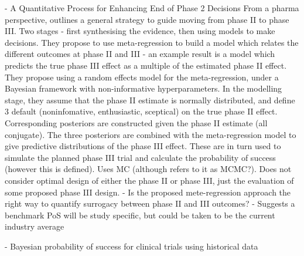 \documentclass{article} %
\begin{document}
\cite{Sabin2014} - A Quantitative Process for Enhancing End of Phase 2 Decisions
From a pharma perspective, outlines a general strategy to guide moving from phase II to phase III. Two stages - first synthesising the evidence, then using models to make decisions. They propose to use meta-regression to build a model which relates the different outcomes at phase II and III - an example result is a model which predicts the true phase III effect as a multiple of the estimated phase II effect. They propose using a random effects model for the meta-regression, under a Bayesian framework with non-informative hyperparameters. In the modelling stage, they assume that the phase II estimate is normally distributed, and define 3 default (noninfomative, enthusiastic, sceptical) on the true phase II effect. Corresponding posteriors are constructed given the phase II estimate (all conjugate). The three posteriors are combined with the meta-regression model to give predictive distributions of the phase III effect. These are in turn used to simulate the planned phase III trial and calculate the probability of success (however this is defined). Uses MC (although refers to it as MCMC?). Does not consider optimal design of either the phase II or phase III, just the evaluation of some proposed phase III design.
- Is the proposed mete-regression approach the right way to quantify surrogacy between phase II and III outcomes?
- Suggests a benchmark PoS will be study specific, but could be taken to be the current industry average 

\cite{Ibrahim2014} - Bayesian probability of success for clinical trials using historical data
\end{document}
